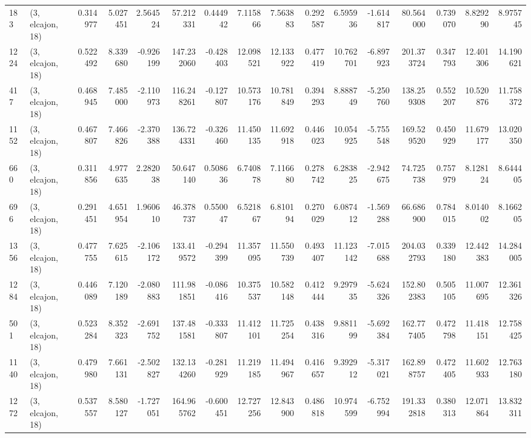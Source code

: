 \begin{tabular}{llrrrrrrrrrrrrrr}
183  &  (3, elcajon, 18) &   0.314977 &   5.027451 &   2.564524 &     57.212331 &    0.444942 &    7.115866 &    7.563883 &  0.292587 &   6.595936 &  -1.614817 &    80.564000 &   0.739070 &   8.829290 &   8.975745 \\
1224 &  (3, elcajon, 18) &   0.522492 &   8.339680 &  -0.926199 &    147.232060 &   -0.428403 &   12.098521 &   12.133922 &  0.477419 &  10.762701 &  -6.897923 &   201.373724 &   0.347793 &  12.401306 &  14.190621 \\
417  &  (3, elcajon, 18) &   0.468945 &   7.485000 &  -2.110973 &    116.248261 &   -0.127807 &   10.573176 &   10.781849 &  0.394293 &   8.888749 &  -5.250760 &   138.259308 &   0.552207 &  10.520876 &  11.758372 \\
1152 &  (3, elcajon, 18) &   0.467807 &   7.466826 &  -2.370388 &    136.724331 &   -0.326460 &   11.450135 &   11.692918 &  0.446023 &  10.054925 &  -5.755548 &   169.529520 &   0.450929 &  11.679177 &  13.020350 \\
660  &  (3, elcajon, 18) &   0.311856 &   4.977635 &   2.282038 &     50.647140 &    0.508636 &    6.740878 &    7.116680 &  0.278742 &   6.283825 &  -2.942675 &    74.725738 &   0.757979 &   8.128124 &   8.644405 \\
696  &  (3, elcajon, 18) &   0.291451 &   4.651954 &   1.960610 &     46.378737 &    0.550047 &    6.521867 &    6.810194 &  0.270029 &   6.087412 &  -1.569288 &    66.686900 &   0.784015 &   8.014002 &   8.166205 \\
1356 &  (3, elcajon, 18) &   0.477755 &   7.625615 &  -2.106172 &    133.419572 &   -0.294399 &   11.357095 &   11.550739 &  0.493407 &  11.123142 &  -7.015688 &   204.032793 &   0.339180 &  12.442383 &  14.284005 \\
1284 &  (3, elcajon, 18) &   0.446089 &   7.120189 &  -2.080883 &    111.981851 &   -0.086416 &   10.375537 &   10.582148 &  0.412444 &   9.297935 &  -5.624326 &   152.802383 &   0.505105 &  11.007695 &  12.361326 \\
501  &  (3, elcajon, 18) &   0.523284 &   8.352323 &  -2.691752 &    137.481581 &   -0.333807 &   11.412101 &   11.725254 &  0.438316 &   9.881199 &  -5.692384 &   162.777405 &   0.472798 &  11.418151 &  12.758425 \\
1140 &  (3, elcajon, 18) &   0.479980 &   7.661131 &  -2.502827 &    132.134260 &   -0.281929 &   11.219185 &   11.494967 &  0.416657 &   9.392912 &  -5.317021 &   162.898757 &   0.472405 &  11.602933 &  12.763180 \\
1272 &  (3, elcajon, 18) &   0.537557 &   8.580127 &  -1.727051 &    164.965762 &   -0.600451 &   12.727256 &   12.843900 &  0.486818 &  10.974599 &  -6.752994 &   191.332818 &   0.380313 &  12.071864 &  13.832311 \\

\end{tabular}

